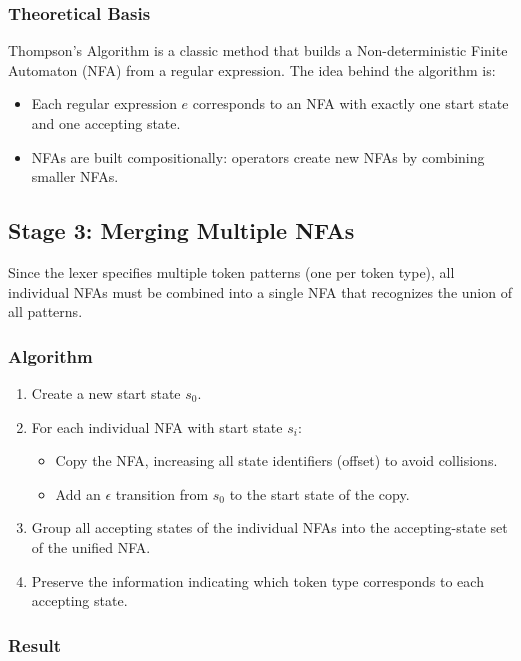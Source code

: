 \documentclass[12pt,a4paper]{report}
\begin{document}
\subsubsection{Theoretical Basis}

Thompson's Algorithm is a classic method that builds a Non-deterministic Finite Automaton (NFA) from a regular expression.
The idea behind the algorithm is:
\begin{itemize}
    \item Each regular expression $e$ corresponds to an NFA with exactly one start state and one accepting state.
    \item NFAs are built compositionally: operators create new NFAs by combining smaller NFAs.
\end{itemize}


\subsection{Stage 3: Merging Multiple NFAs}

Since the lexer specifies multiple token patterns (one per token type), all individual NFAs must be combined into a single NFA that recognizes the union of all patterns.

\subsubsection{Algorithm}

\begin{enumerate}
    \item Create a new start state $s_0$.
    \item For each individual NFA with start state $s_i$:
    \begin{itemize}
        \item Copy the NFA, increasing all state identifiers (offset) to avoid collisions.
        \item Add an $\epsilon$ transition from $s_0$ to the start state of the copy.
    \end{itemize}
    \item Group all accepting states of the individual NFAs into the accepting-state set of the unified NFA.
    \item Preserve the information indicating which token type corresponds to each accepting state.
\end{enumerate}

\subsubsection{Result}
\end{document}
